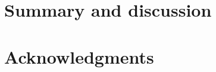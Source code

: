 \documentclass{article}
\theoremstyle{plain}
\theoremstyle{definition}
\numberwithin{theorem}{section}
\newcommand{\todo}[1]{{\Large{\color{red}{#1}}}}
\begin{document}
\todo{TODO}



\section{Summary and discussion}

\todo{TODO}



\appendix

\section*{Acknowledgments}

\todo{TODO: funding}
% 


\printbibliography
\end{document}
